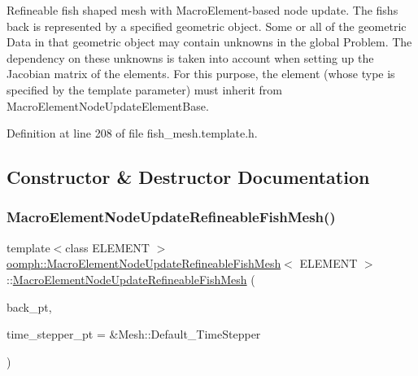 Refineable fish shaped mesh with Macro\+Element-\/based node update. The fish\textquotesingle{}s back is represented by a specified geometric object. Some or all of the geometric Data in that geometric object may contain unknowns in the global Problem. The dependency on these unknowns is taken into account when setting up the Jacobian matrix of the elements. For this purpose, the element (whose type is specified by the template parameter) must inherit from Macro\+Element\+Node\+Update\+Element\+Base. 

Definition at line 208 of file fish\+\_\+mesh.\+template.\+h.



\subsection{Constructor \& Destructor Documentation}
\mbox{\label{classoomph_1_1MacroElementNodeUpdateRefineableFishMesh_a7adcb19be3d66c63d88bf87d4822dacc}} 
\subsubsection{\texorpdfstring{Macro\+Element\+Node\+Update\+Refineable\+Fish\+Mesh()}{MacroElementNodeUpdateRefineableFishMesh()}}
{\footnotesize\ttfamily template$<$class E\+L\+E\+M\+E\+NT $>$ \\
\hyperlink{classoomph_1_1MacroElementNodeUpdateRefineableFishMesh}{oomph\+::\+Macro\+Element\+Node\+Update\+Refineable\+Fish\+Mesh}$<$ E\+L\+E\+M\+E\+NT $>$\+::\hyperlink{classoomph_1_1MacroElementNodeUpdateRefineableFishMesh}{Macro\+Element\+Node\+Update\+Refineable\+Fish\+Mesh} (\begin{DoxyParamCaption}\item[{Geom\+Object $\ast$}]{back\+\_\+pt,  }\item[{Time\+Stepper $\ast$}]{time\+\_\+stepper\+\_\+pt = {\ttfamily \&Mesh\+:\+:Default\+\_\+TimeStepper} }\end{DoxyParamCaption})\hspace{0.3cm}{\ttfamily [inline]}}



